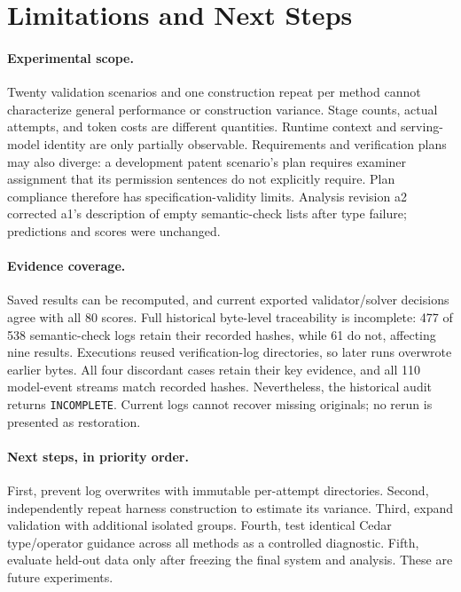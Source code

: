 \documentclass[11pt]{article}
\begin{document}
\section{Limitations and Next Steps}
\paragraph{Experimental scope.}
Twenty validation scenarios and one construction repeat per method cannot characterize general performance or construction variance. Stage counts, actual attempts, and token costs are different quantities. Runtime context and serving-model identity are only partially observable. Requirements and verification plans may also diverge: a development patent scenario's plan requires examiner assignment that its permission sentences do not explicitly require. Plan compliance therefore has specification-validity limits. Analysis revision a2 corrected a1's description of empty semantic-check lists after type failure; predictions and scores were unchanged.

\paragraph{Evidence coverage.}
Saved results can be recomputed, and current exported validator/solver decisions agree with all 80 scores. Full historical byte-level traceability is incomplete: 477 of 538 semantic-check logs retain their recorded hashes, while 61 do not, affecting nine results. Executions reused verification-log directories, so later runs overwrote earlier bytes. All four discordant cases retain their key evidence, and all 110 model-event streams match recorded hashes. Nevertheless, the historical audit returns \texttt{INCOMPLETE}. Current logs cannot recover missing originals; no rerun is presented as restoration.

\paragraph{Next steps, in priority order.}
First, prevent log overwrites with immutable per-attempt directories. Second, independently repeat harness construction to estimate its variance. Third, expand validation with additional isolated groups. Fourth, test identical Cedar type/operator guidance across all methods as a controlled diagnostic. Fifth, evaluate held-out data only after freezing the final system and analysis. These are future experiments.

\label{LastBodyPage}
\clearpage

\end{document}
